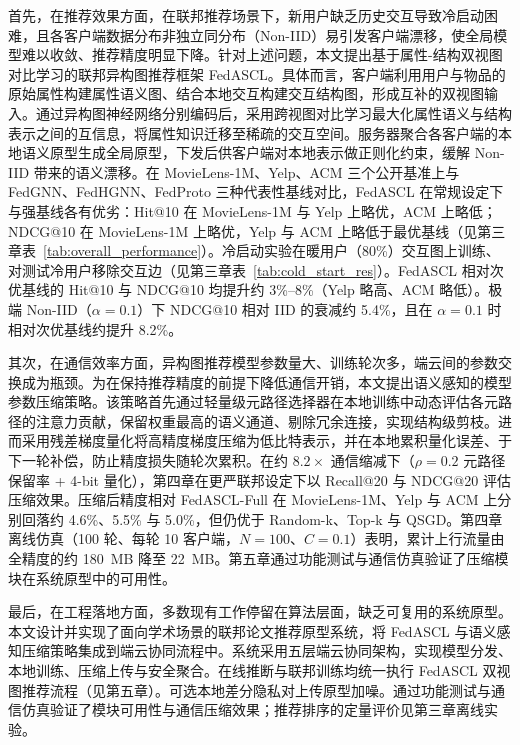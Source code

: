 首先，在推荐效果方面，在联邦推荐场景下，新用户缺乏历史交互导致冷启动困难，且各客户端数据分布非独立同分布（Non-IID）易引发客户端漂移，使全局模型难以收敛、推荐精度明显下降。针对上述问题，本文提出基于属性-结构双视图对比学习的联邦异构图推荐框架 FedASCL。具体而言，客户端利用用户与物品的原始属性构建属性语义图、结合本地交互构建交互结构图，形成互补的双视图输入。通过异构图神经网络分别编码后，采用跨视图对比学习最大化属性语义与结构表示之间的互信息，将属性知识迁移至稀疏的交互空间。服务器聚合各客户端的本地语义原型生成全局原型，下发后供客户端对本地表示做正则化约束，缓解 Non-IID 带来的语义漂移。在 MovieLens-1M、Yelp、ACM 三个公开基准上与 FedGNN、FedHGNN、FedProto 三种代表性基线对比，FedASCL 在常规设定下与强基线各有优劣：Hit@10 在 MovieLens-1M 与 Yelp 上略优，ACM 上略低；NDCG@10 在 MovieLens-1M 上略优，Yelp 与 ACM 上略低于最优基线（见第三章表~\ref{tab:overall_performance}）。冷启动实验在暖用户（80\%）交互图上训练、对测试冷用户移除交互边（见第三章表~\ref{tab:cold_start_res}）。FedASCL 相对次优基线的 Hit@10 与 NDCG@10 均提升约 3\%--8\%（Yelp 略高、ACM 略低）。极端 Non-IID（$\alpha=0.1$）下 NDCG@10 相对 IID 的衰减约 5.4\%，且在 $\alpha=0.1$ 时相对次优基线约提升 8.2\%。

其次，在通信效率方面，异构图推荐模型参数量大、训练轮次多，端云间的参数交换成为瓶颈。为在保持推荐精度的前提下降低通信开销，本文提出语义感知的模型参数压缩策略。该策略首先通过轻量级元路径选择器在本地训练中动态评估各元路径的注意力贡献，保留权重最高的语义通道、剔除冗余连接，实现结构级剪枝。进而采用残差梯度量化将高精度梯度压缩为低比特表示，并在本地累积量化误差、于下一轮补偿，防止精度损失随轮次累积。在约 $8.2\times$ 通信缩减下（$\rho=0.2$ 元路径保留率 + 4-bit 量化），第四章在更严联邦设定下以 Recall@20 与 NDCG@20 评估压缩效果。压缩后精度相对 FedASCL-Full 在 MovieLens-1M、Yelp 与 ACM 上分别回落约 4.6\%、5.5\% 与 5.0\%，但仍优于 Random-k、Top-k 与 QSGD。第四章离线仿真（100 轮、每轮 10 客户端，$N{=}100$、$C{=}0.1$）表明，累计上行流量由全精度的约 180~MB 降至 22~MB。第五章通过功能测试与通信仿真验证了压缩模块在系统原型中的可用性。

最后，在工程落地方面，多数现有工作停留在算法层面，缺乏可复用的系统原型。本文设计并实现了面向学术场景的联邦论文推荐原型系统，将 FedASCL 与语义感知压缩策略集成到端云协同流程中。系统采用五层端云协同架构，实现模型分发、本地训练、压缩上传与安全聚合。在线推断与联邦训练均统一执行 FedASCL 双视图推荐流程（见第五章）。可选本地差分隐私对上传原型加噪。通过功能测试与通信仿真验证了模块可用性与通信压缩效果；推荐排序的定量评价见第三章离线实验。

